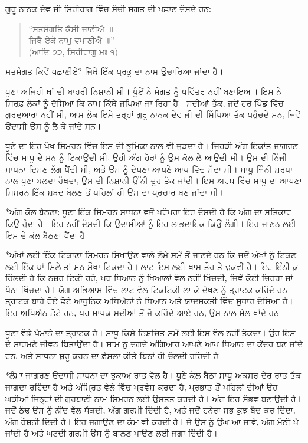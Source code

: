 \documentclass[12pt,a5paper,twoside]{book}  %
\makeatletter
\renewcommand\section{\@startsection{section}{1}{0pt}{1.2em}{0.6em}{\punjabifont\Large\bfseries}}%
\renewcommand\subsection{\@startsection{subsection}{2}{0pt}{1em}{0.5em}{\punjabifont\large\bfseries}}%
\makeatother
\begin{document}
{ਗੁਰੂ ਨਾਨਕ ਦੇਵ ਜੀ ਸਿਰੀਰਾਗ ਵਿੱਚ ਸੱਚੀ ਸੰਗਤ ਦੀ ਪਛਾਣ ਦੱਸਦੇ ਹਨ:

\begin{quote}
“ਸਤਸੰਗਤਿ ਕੈਸੀ ਜਾਣੀਐ ॥ \\
ਜਿਥੈ ਏਕੋ ਨਾਮੁ ਵਖਾਣੀਐ ॥” \\
(ਆਦਿ ੭੨, ਸਿਰੀਰਾਗੁ ਮਃ ੧)
\end{quote}
ਸਤਸੰਗਤ ਕਿਵੇਂ ਪਛਾਣੀਏ? ਜਿੱਥੇ ਇੱਕ ਪ੍ਰਭੂ ਦਾ ਨਾਮ ਉਚਾਰਿਆ ਜਾਂਦਾ ਹੈ।

ਧੂਣਾ ਅਜਿਹੀ ਥਾਂ ਦੀ ਬਾਹਰੀ ਨਿਸ਼ਾਨੀ ਸੀ। ਧੂੰਏਂ ਨੇ ਸੰਗਤ ਨੂੰ ਪਵਿੱਤਰ ਨਹੀਂ ਬਣਾਇਆ। ਇਸ ਨੇ ਸਿਰਫ਼ ਲੋਕਾਂ ਨੂੰ ਦੱਸਿਆ ਕਿ ਨਾਮ ਕਿੱਥੇ ਜਪਿਆ ਜਾ ਰਿਹਾ ਹੈ। ਸਦੀਆਂ ਤੱਕ, ਜਦੋਂ ਹਰ ਪਿੰਡ ਵਿੱਚ ਗੁਰਦੁਆਰਾ ਨਹੀਂ ਸੀ, ਆਮ ਲੋਕ ਇਸੇ ਤਰ੍ਹਾਂ ਗੁਰੂ ਨਾਨਕ ਦੇਵ ਜੀ ਦੀ ਸਿੱਖਿਆ ਤੱਕ ਪਹੁੰਚਦੇ ਸਨ, ਜਿਵੇਂ ਉਦਾਸੀ ਉਸ ਨੂੰ ਲੈ ਕੇ ਜਾਂਦੇ ਸਨ।

ਧੂਣੇ ਦਾ ਇਹ ਪੱਖ ਸਿਮਰਨ ਵਿੱਚ ਇਸ ਦੀ ਭੂਮਿਕਾ ਨਾਲ ਵੀ ਜੁੜਦਾ ਹੈ। ਜਿਹੜੀ ਅੱਗ ਇਕਾਂਤ ਜਾਗਰਣ ਵਿੱਚ ਸਾਧੂ ਦੇ ਮਨ ਨੂੰ ਟਿਕਾਉਂਦੀ ਸੀ, ਉਹੀ ਅੱਗ ਹੋਰਾਂ ਨੂੰ ਉਸ ਕੋਲ ਲੈ ਆਉਂਦੀ ਸੀ। ਉਸ ਦੀ ਨਿੱਜੀ ਸਾਧਨਾ ਦਿਸਣ ਲੱਗ ਪੈਂਦੀ ਸੀ, ਅਤੇ ਉਸ ਨੂੰ ਦੇਖਣਾ ਆਪਣੇ ਆਪ ਵਿੱਚ ਸੱਦਾ ਸੀ। ਸਾਧੂ ਜਿੰਨੀ ਸ਼ਰਧਾ ਨਾਲ ਧੂਣਾ ਬਲਦਾ ਰੱਖਦਾ, ਉਸ ਦੀ ਨਿਸ਼ਾਨੀ ਉੱਨੀ ਦੂਰ ਤੱਕ ਜਾਂਦੀ। ਇਸ ਅਰਥ ਵਿੱਚ ਸਾਧੂ ਦਾ ਆਪਣਾ ਸਿਮਰਨ ਇੱਕ ਸ਼ਬਦ ਬੋਲਣ ਤੋਂ ਪਹਿਲਾਂ ਹੀ ਉਸ ਦਾ ਪ੍ਰਚਾਰ ਬਣ ਜਾਂਦਾ ਸੀ।


\section*{ਅੱਗ ਕੋਲ ਬੈਠਣਾ: ਧੂਣਾ ਇੱਕ ਸਿਮਰਨ ਸਾਧਨਾ ਵਜੋਂ}
ਪਰੰਪਰਾ ਇਹ ਦੱਸਦੀ ਹੈ ਕਿ ਅੱਗ ਦਾ ਸਤਿਕਾਰ ਕਿਉਂ ਹੁੰਦਾ ਹੈ। ਇਹ ਨਹੀਂ ਦੱਸਦੀ ਕਿ ਉਦਾਸੀਆਂ ਨੂੰ ਇਹ ਲਾਭਦਾਇਕ ਕਿਉਂ ਲੱਗੀ। ਇਹ ਜਾਣਨ ਲਈ ਇਸ ਦੇ ਕੋਲ ਬੈਠਣਾ ਪੈਂਦਾ ਹੈ।


\subsection*{ਅੱਖਾਂ ਲਈ ਇੱਕ ਟਿਕਾਣਾ}
ਸਿਮਰਨ ਸਿਖਾਉਣ ਵਾਲੇ ਲੰਮੇ ਸਮੇਂ ਤੋਂ ਜਾਣਦੇ ਹਨ ਕਿ ਜਦੋਂ ਅੱਖਾਂ ਨੂੰ ਟਿਕਣ ਲਈ ਇੱਕ ਥਾਂ ਮਿਲੇ ਤਾਂ ਮਨ ਸੌਖਾ ਟਿਕਦਾ ਹੈ। ਲਾਟ ਇਸ ਲਈ ਖਾਸ ਤੌਰ ਤੇ ਢੁਕਵੀਂ ਹੈ। ਇਹ ਇੰਨੀ ਕੁ ਹਿੱਲਦੀ ਹੈ ਕਿ ਨਜ਼ਰ ਟਿਕੀ ਰਹੇ, ਪਰ ਧਿਆਨ ਨੂੰ ਖਿਆਲਾਂ ਵੱਲ ਨਹੀਂ ਖਿੱਚਦੀ, ਜਿਵੇਂ ਕੋਈ ਚਿਹਰਾ ਜਾਂ ਪੰਨਾ ਖਿੱਚਦਾ ਹੈ। ਯੋਗ ਅਭਿਆਸ ਵਿੱਚ ਲਾਟ ਵੱਲ ਟਿਕਟਿਕੀ ਲਾ ਕੇ ਦੇਖਣ ਨੂੰ ਤ੍ਰਾਟਕ ਕਹਿੰਦੇ ਹਨ। ਤ੍ਰਾਟਕ ਬਾਰੇ ਹੋਏ ਛੋਟੇ ਆਧੁਨਿਕ ਅਧਿਐਨਾਂ ਨੇ ਧਿਆਨ ਅਤੇ ਯਾਦਸ਼ਕਤੀ ਵਿੱਚ ਸੁਧਾਰ ਦੱਸਿਆ ਹੈ। ਇਹ ਅਧਿਐਨ ਛੋਟੇ ਹਨ, ਪਰ ਸਾਧਕ ਸਦੀਆਂ ਤੋਂ ਜੋ ਕਹਿੰਦੇ ਆਏ ਹਨ, ਉਸ ਨਾਲ ਮੇਲ ਖਾਂਦੇ ਹਨ।

ਧੂਣਾ ਵੱਡੇ ਪੈਮਾਨੇ ਦਾ ਤ੍ਰਾਟਕ ਹੈ। ਸਾਧੂ ਕਿਸੇ ਨਿਸ਼ਚਿਤ ਸਮੇਂ ਲਈ ਇਸ ਵੱਲ ਨਹੀਂ ਤੱਕਦਾ। ਉਹ ਇਸ ਦੇ ਸਾਹਮਣੇ ਜੀਵਨ ਬਿਤਾਉਂਦਾ ਹੈ। ਸ਼ਾਮ ਨੂੰ ਦਗਦੇ ਅੰਗਿਆਰ ਆਪਣੇ ਆਪ ਧਿਆਨ ਦਾ ਕੇਂਦਰ ਬਣ ਜਾਂਦੇ ਹਨ, ਅਤੇ ਸਾਧਨਾ ਸ਼ੁਰੂ ਕਰਨ ਦਾ ਫ਼ੈਸਲਾ ਕੀਤੇ ਬਿਨਾਂ ਹੀ ਚੱਲਦੀ ਰਹਿੰਦੀ ਹੈ।


\subsection*{ਲੰਮਾ ਜਾਗਰਣ}
ਉਦਾਸੀ ਸਾਧਨਾ ਦਾ ਝੁਕਾਅ ਰਾਤ ਵੱਲ ਹੈ। ਧੂਣੇ ਕੋਲ ਬੈਠਾ ਸਾਧੂ ਅਕਸਰ ਦੇਰ ਰਾਤ ਤੱਕ ਜਾਗਦਾ ਰਹਿੰਦਾ ਹੈ ਅਤੇ ਅੰਮ੍ਰਿਤ ਵੇਲੇ ਵਿੱਚ ਪ੍ਰਵੇਸ਼ ਕਰਦਾ ਹੈ, ਪ੍ਰਭਾਤ ਤੋਂ ਪਹਿਲਾਂ ਦੀਆਂ ਉਹ ਘੜੀਆਂ ਜਿਨ੍ਹਾਂ ਦੀ ਗੁਰਬਾਣੀ ਨਾਮ ਸਿਮਰਨ ਲਈ ਉਸਤਤ ਕਰਦੀ ਹੈ। ਅੱਗ ਇਹ ਸੰਭਵ ਬਣਾਉਂਦੀ ਹੈ। ਜਦੋਂ ਠੰਢ ਉਸ ਨੂੰ ਨੀਂਦ ਵੱਲ ਧੱਕਦੀ, ਅੱਗ ਗਰਮੀ ਦਿੰਦੀ ਹੈ, ਅਤੇ ਜਦੋਂ ਹਨੇਰਾ ਸਭ ਕੁਝ ਬੰਦ ਕਰ ਦਿੰਦਾ, ਅੱਗ ਰੌਸ਼ਨੀ ਦਿੰਦੀ ਹੈ। ਇਹ ਜਗਾਉਣ ਦਾ ਕੰਮ ਵੀ ਕਰਦੀ ਹੈ। ਜੇ ਉਸ ਨੂੰ ਊਂਘ ਆ ਜਾਵੇ, ਅੱਗ ਮੱਠੀ ਪੈ ਜਾਂਦੀ ਹੈ ਅਤੇ ਘਟਦੀ ਗਰਮੀ ਉਸ ਨੂੰ ਬਾਲਣ ਪਾਉਣ ਲਈ ਜਗਾ ਦਿੰਦੀ ਹੈ।

}
\end{document}
